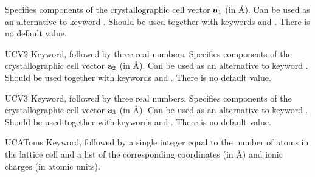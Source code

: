 \begin{keywordlist}
Specifies components of the crystallographic cell vector ${\bf a}_1$ (in \AA).
Can be used as an alternative to keyword .
Should be used together with keywords  and .
There is no default value.
\item[UCV2]
Keyword, followed by three real numbers.
Specifies components of the crystallographic cell vector ${\bf a}_2$ (in \AA).
Can be used as an alternative to keyword .
Should be used together with keywords  and .
There is no default value.
\item[UCV3]
Keyword, followed by three real numbers.
Specifies components of the crystallographic cell vector ${\bf a}_3$ (in \AA).
Can be used as an alternative to keyword .
Should be used together with keywords  and .
There is no default value.
\item[UCAToms]
Keyword, followed by a single integer equal to the number of atoms in the lattice cell
and a list of the corresponding coordinates (in \AA) and ionic charges (in atomic units).
\end{keywordlist}

